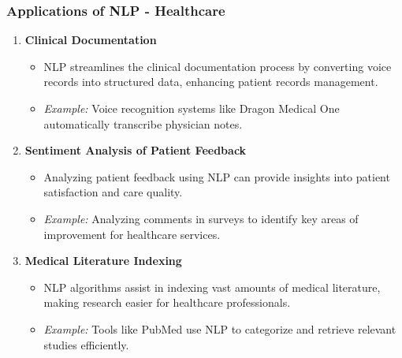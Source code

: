 \documentclass{beamer}
\begin{document}
\begin{frame}[fragile]
    \frametitle{Applications of NLP - Healthcare}
    \begin{enumerate}
        \item \textbf{Clinical Documentation}
        \begin{itemize}
            \item NLP streamlines the clinical documentation process by converting voice records into structured data, enhancing patient records management.
            \item \textit{Example:} Voice recognition systems like Dragon Medical One automatically transcribe physician notes.
        \end{itemize}
        
        \item \textbf{Sentiment Analysis of Patient Feedback}
        \begin{itemize}
            \item Analyzing patient feedback using NLP can provide insights into patient satisfaction and care quality.
            \item \textit{Example:} Analyzing comments in surveys to identify key areas of improvement for healthcare services.
        \end{itemize}
        
        \item \textbf{Medical Literature Indexing}
        \begin{itemize}
            \item NLP algorithms assist in indexing vast amounts of medical literature, making research easier for healthcare professionals.
            \item \textit{Example:} Tools like PubMed use NLP to categorize and retrieve relevant studies efficiently.
        \end{itemize}
    \end{enumerate}
\end{frame}
\end{document}
